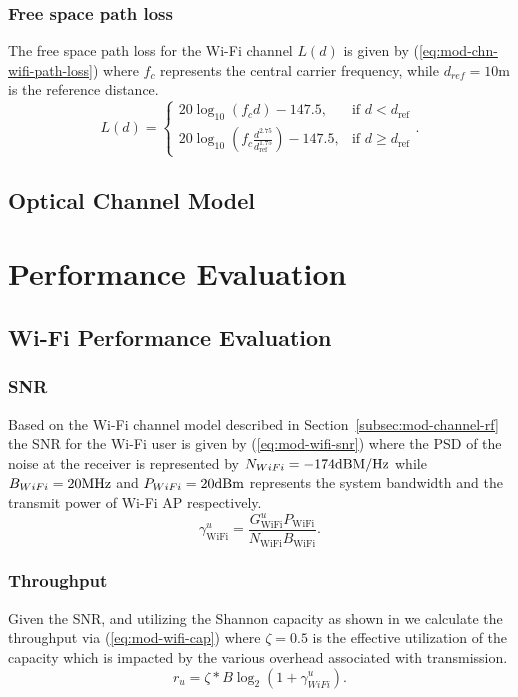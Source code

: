 \subsubsection{Free space path loss}
The free space path loss for the Wi-Fi channel $L(d)$ is given by (\ref{eq:mod-chn-wifi-path-loss}) where $f_c$ represents the central carrier frequency, while $d_{ref} = 10 \text{m}$ is the reference distance.
\begin{equation}
    L(d) = 
\begin{cases} 
20 \log_{10}(f_c d) - 147.5, & \text{if } d < d_{\text{ref}} \\
20 \log_{10}(f_c \frac{d^{2.75}}{d_{\text{ref}}^{1.75}}) - 147.5, & \text{if } d \geq d_{\text{ref}}
\end{cases}.
\label{eq:mod-chn-wifi-path-loss}
\end{equation}
\subsection{Optical Channel Model}
\label{subsec:mod-channel-optical}
\section{Performance Evaluation}
\label{sec:mod-perf}
\subsection{Wi-Fi Performance Evaluation}
\label{subsec:mod-perf-rf}
\subsubsection{SNR}
Based on the Wi-Fi channel model described in Section~\ref{subsec:mod-channel-rf} the SNR for the Wi-Fi user is given by (\ref{eq:mod-wifi-snr}) where the PSD of the noise at the receiver is represented by $N_{WiFi}=-174\space \text{dBM/Hz}$ while $B_{WiFi} = 20 \space \text{MHz}$ and $P_{WiFi}= 20 \space \text{dBm}$ represents the system bandwidth and the transmit power of Wi-Fi AP respectively.
\begin{equation}
    \gamma^{u}_{\text{WiFi}} = \frac{G^{u}_{\text{WiFi}} P_{\text{WiFi}}}{N_{\text{WiFi}} B_{\text{WiFi}}} .
    \label{eq:mod-wifi-snr}
\end{equation}
\subsubsection{Throughput}
Given the SNR, and utilizing the Shannon capacity as shown in \cite{wu_novel_2020-1} we calculate the throughput via (\ref{eq:mod-wifi-cap}) where $\zeta = 0.5$ is the effective utilization of the capacity which is impacted by the various overhead associated with transmission\cite{islam_throughput_2016}.
\begin{equation}
    r_u = \zeta * B \log_2(1 + \gamma_{WiFi}^u).
    \label{eq:mod-wifi-cap}
\end{equation}

